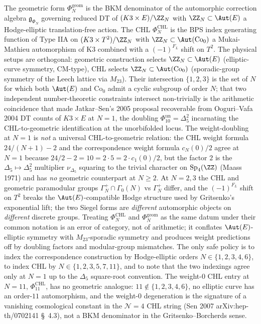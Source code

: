 \begin{remark}
\label{rem:cy-c-beyond-k3e-chl-programme-physical-dichotomy}
The geometric form $\Phi_N^{\mathrm{geom}}$ is the BKM denominator of the
automorphic correction algebra $\mathfrak g_{\Phi_N}$ governing
reduced DT of $(K3\times E)/\ZZ_N$ with $\ZZ_N\subset\Aut(E)$ a
Hodge-elliptic translation-free action. The CHL
$\Phi_N^{\mathrm{CHL}}$ is the BPS index generating function of
Type IIA on $(K3\times T^2)/\ZZ_N$ with $\ZZ_N\subset\Aut(\mathrm{Co}_0)$
a Mukai-Mathieu automorphism of K3 combined with a $(-1)^{F_L}$ shift
on $T^2$. The physical setups are orthogonal: geometric construction selects
$\ZZ_N\subset\Aut(E)$ (elliptic-curve symmetry, CM-type), CHL selects
$\ZZ_N\subset\Aut(\mathrm{Co}_0)$ (sporadic-group symmetry of the
Leech lattice via $M_{23}$). Their intersection $\{1,2,3\}$ is the
set of $N$ for which both $\Aut(E)$ and $\mathrm{Co}_0$ admit a
cyclic subgroup of order $N$; that two independent number-theoretic
constraints intersect non-trivially is the arithmetic coincidence
that made Jatkar--Sen's 2005 proposal recoverable from Ooguri--Vafa
2004 DT counts of $K3\times E$ at $N=1$, the doubling
$\Phi_{10}^{\mathrm{un}}=\Delta_5^2$ incarnating the CHL-to-geometric
identification at the unorbifolded locus.
The weight-doubling at $N=1$ is \emph{not} a universal CHL-to-geometric
relation: the CHL weight formula $24/(N+1)-2$ and the correspondence weight
formula $c_N(0)/2$ agree at $N=1$ because
$24/2-2=10=2\cdot 5=2\cdot c_1(0)/2$, but the factor $2$ is the
$\Delta_5\mapsto\Delta_5^2$ multiplier $\nu_{\Delta_5}$ squaring to
the trivial character on $\mathrm{Sp}_4(\ZZ)$ (Maass 1971) and has
\emph{no} geometric counterpart at $N\ge 2$. At $N=2,3$ the CHL and
geometric paramodular groups $\Gamma_N^+\cap\Gamma_0(N)$ vs
$\Gamma_N^+$ differ, and the $(-1)^{F_L}$ shift on $T^2$ breaks the
$\Aut(E)$-compatible Hodge structure used by Gritsenko's exponential
lift; the two Siegel forms are \emph{different} automorphic objects
on \emph{different} discrete groups. Treating $\Phi_N^{\mathrm{CHL}}$
and $\Phi_N^{\mathrm{geom}}$ as the same datum under their common
notation is an error of category, not of arithmetic; it conflates
$\Aut(E)$-elliptic symmetry with $M_{23}$-sporadic symmetry and
produces weight predictions off by doubling factors and modular-group
mismatches. The only safe policy is to index the correspondence
construction by Hodge-elliptic orders $N\in\{1,2,3,4,6\}$, to index
CHL by $N\in\{1,2,3,5,7,11\}$, and to note that the two indexings
agree only at $N=1$ up to the $\Delta_5$ square-root convention.
The weight-$0$ CHL entry at $N=11$, $\Phi_{11}^{\mathrm{CHL}}$, has
no geometric analogue: $11\notin\{1,2,3,4,6\}$, no elliptic curve
has an order-$11$ automorphism, and the weight-$0$ degeneration is
the signature of a vanishing cosmological constant in the
$\mathcal N=4$ CHL string (Sen 2007 arXiv:hep-th/0702141 §~4.3),
not a BKM denominator in the Gritsenko--Borcherds sense.
\end{remark}

